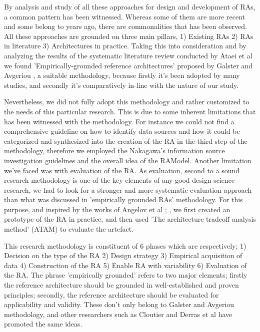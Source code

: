 \documentclass[review]{elsarticle}
\begin{document}
By analysis and study of all these approaches for design and development of RAs, a common pattern has been witnessed. Whereas some of them are more recent and some belong to years ago, there are commonalities that has been observed. All these approaches are grounded on three main pillars, 1) Existing RAs 2) RAs in literature 3) Architectures in practice. Taking this into consideration and by analyzing the results of the systematic literature review conducted by Ataei et al \cite{AtaeiACIS} we found 'Empirically-grounded reference architectures' proposed by Galster and Avgeriou \cite{galster2011empirically}, a suitable methodology, because firstly it's been adopted by many studies, and secondly it's comparatively in-line with the nature of our study.

Nevertheless, we did not fully adopt this methodology and rather customized to the needs of this particular research. This is due to some inherent limitations that has been witnessed with the methodology. For instance we could not find a comprehensive guideline on how to identify data sources and how it could be categorized and synthesized into the creation of the RA in the third step of the methodology, therefore we employed the Nakagawa's information source investigation guidelines and the overall idea of the RAModel. Another limitation we've faced was with evaluation of the RA. As evaluation, second to a sound research methodology is one of the key elements of any good design science research, we had to look for a stronger and more systematic evaluation approach than what was discussed in 'empirically grounded RAs' methodology. For this purpose, and inspired by the works of Angelov et al \cite{angelov2008towards}; \cite{angelov2014extending}, we first created an prototype of the RA in practice, and then used 'The architecture tradeoff analysis method' (ATAM) \cite{kazman1998architecture} to evaluate the artefact.

This research methodology is constituent of 6 phases which are respectively; 1) Decision on the type of the RA 2) Design strategy 3) Empirical acquisition of data 4) Construction of the RA 5) Enable RA with variability 6) Evaluation of the RA. The phrase 'empirically grounded' refers to two major elements; firstly the reference architecture should be grounded in well-established and proven principles; secondly, the reference architecture should be evaluated for applicability and validity. These don't only belong to Galster and Avgeriou methodology, and other researchers such as Cloutier \cite{Cloutier} and Derras et al \cite{Derras} have promoted the same ideas.
\end{document}
